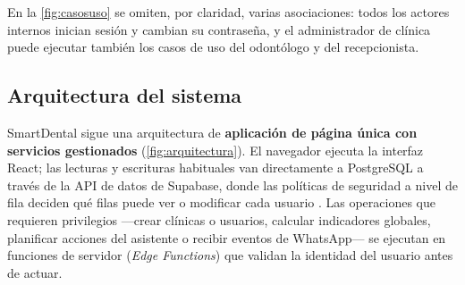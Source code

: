 \documentclass[11pt]{article}
\begin{document}
En la \cref{fig:casosuso} se omiten, por claridad, varias asociaciones: todos los actores internos inician sesión y cambian su contraseña, y el administrador de clínica puede ejecutar también los casos de uso del odontólogo y del recepcionista.

\subsection{Arquitectura del sistema}

SmartDental sigue una arquitectura de \textbf{aplicación de página única con servicios gestionados} (\cref{fig:arquitectura}). El navegador ejecuta la interfaz React; las lecturas y escrituras habituales van directamente a PostgreSQL a través de la API de datos de Supabase, donde las políticas de seguridad a nivel de fila deciden qué filas puede ver o modificar cada usuario \parencite{postgres2026,supabase2026}. Las operaciones que requieren privilegios —crear clínicas o usuarios, calcular indicadores globales, planificar acciones del asistente o recibir eventos de WhatsApp— se ejecutan en funciones de servidor (\emph{Edge Functions}) que validan la identidad del usuario antes de actuar.
\end{document}
